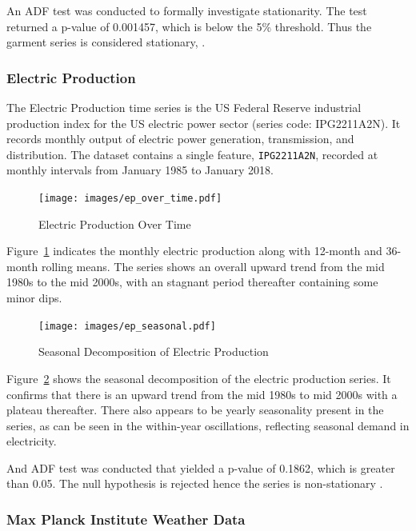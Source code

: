 \documentclass[conference]{IEEEtran}
\begin{document}
An ADF test was conducted to formally investigate stationarity. The test returned a p-value of 0.001457, which is below the 5\% threshold. Thus the garment series is considered stationary, \cite{garment_productivty}.

\subsubsection{\textbf{Electric Production}}

The Electric Production time series is the US Federal Reserve industrial production index for the US electric power sector (series code: IPG2211A2N). It records monthly output of electric power generation, transmission, and distribution. The dataset contains a single feature, \texttt{IPG2211A2N}, recorded at monthly intervals from January 1985 to January 2018.

\begin{figure}[H]
    \centering
    \texttt{[image: images/ep\_over\_time.pdf]}
    \caption{Electric Production Over Time}
    \label{fig:ep_over_time}
\end{figure}

Figure~\ref{fig:ep_over_time} indicates the monthly electric production along with 12-month and 36-month rolling means. The series shows an overall upward trend from the mid 1980s to the mid 2000s, with an stagnant period thereafter containing some minor dips.

\begin{figure}[H]
    \centering
    \texttt{[image: images/ep\_seasonal.pdf]}
    \caption{Seasonal Decomposition of Electric Production}
    \label{fig:ep_seasonal}
\end{figure}

Figure~\ref{fig:ep_seasonal} shows the seasonal decomposition of the electric production series. It confirms that there is an upward trend from the mid 1980s to mid 2000s with a plateau thereafter. There also appears to be yearly seasonality present in the series, as can be seen in the within-year oscillations, reflecting seasonal demand in electricity.

And ADF test was conducted that yielded a p-value of 0.1862, which is greater than 0.05. The null hypothesis is rejected hence the series is non-stationary \cite{electric_production}.

\subsubsection{\textbf{Max Planck Institute Weather Data}}
\end{document}
